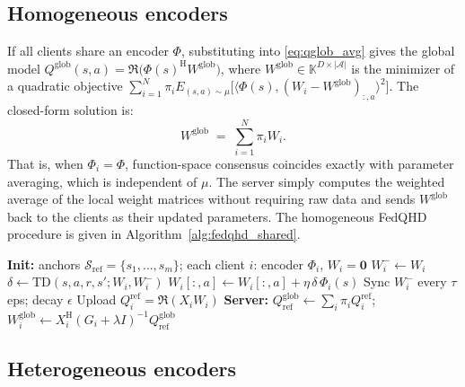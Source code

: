 \documentclass[sigconf,anonymous]{aamas}
\theoremstyle{plain}
\theoremstyle{definition}
\theoremstyle{remark}
\begin{document}
\subsection{Homogeneous encoders}
\label{sec:homo_fedqhd}
If all clients share an encoder $\Phi$, substituting into \eqref{eq:qglob_avg} gives the global model $Q^{\mathrm{glob}}(s,a)=\Re\bigl(\Phi(s)^\mathrm{H}W^{\mathrm{glob}}\bigr)$, where $W^{\mathrm{glob}}\in\mathbb{K}^{D\times|\mathcal{A}|}$ is the minimizer of a quadratic objective $\sum_{i=1}^N \pi_i E_{(s,a)\sim\mu} \big[ \langle \Phi(s), (W_i -W^{\mathrm{glob}})_{:,a} \rangle^2\big]$. The closed-form solution is:
\[
W^{\mathrm{glob}} \;=\; \sum_{i=1}^N \pi_i W_i.
\]
That is, when $\Phi_i=\Phi$, function-space consensus coincides exactly with parameter averaging, which is independent of $\mu$.  The server simply computes the weighted average of the local weight matrices without requiring raw data and sends $W^{\mathrm{glob}}$ back to the clients as their updated parameters. The homogeneous FedQHD procedure is given in Algorithm~\ref{alg:fedqhd_shared}.



\begin{algorithm}[t]
\caption{FedQHD: Heterogeneous Protocol}
\label{alg:fedqhd_heterogeneous}
\begin{algorithmic}[1]
\STATE \textbf{Init:} anchors
       $\mathcal{S}_{\mathrm{ref}}\!=\!\{s_1,\ldots,s_m\}$;
       each client $i$: encoder $\Phi_i$, $W_i\!=\!\mathbf{0}$
        \STATE $W_i^- \leftarrow W_i$
            \STATE $\delta \leftarrow \text{TD}(s,a,r,s'; W_i, W_i^-)$
            \STATE $W_i[:,a] \leftarrow
           W_i[:,a] + \eta\, \delta\, \Phi_i(s)$
            \STATE Sync $W_i^-$ every $\tau$ eps; decay $\epsilon$
        \ENDFOR
        \STATE Upload $Q^{\mathrm{ref}}_i\!=\!\Re(X_iW_i)$
    \ENDFOR
    \STATE \textbf{Server:}
           $Q^{\mathrm{glob}}_{\mathrm{ref}} \leftarrow
           \sum_{i} \pi_i Q^{\mathrm{ref}}_i$;
        \STATE $W_i^{\mathrm{glob}} \leftarrow X_i^{\mathrm{H}}
               (G_i\!+\!\lambda I)^{-1}
               Q^{\mathrm{glob}}_{\mathrm{ref}}$
    \ENDFOR
\ENDFOR
\end{algorithmic}
\end{algorithm}

\subsection{Heterogeneous encoders}
\label{sec:hetero_fedqhd}
\end{document}
